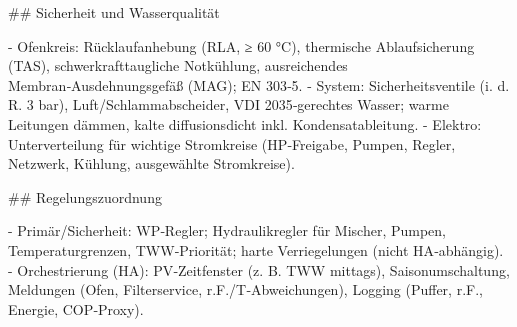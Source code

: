 \documentclass[11pt,oneside]{report}
\begin{document}
\begin{markdown}
## Sicherheit und Wasserqualität

- Ofenkreis: Rücklaufanhebung (RLA, ≥ 60 °C), thermische Ablaufsicherung (TAS), schwerkrafttaugliche Notkühlung, ausreichendes Membran‑Ausdehnungsgefäß (MAG); EN 303‑5.
- System: Sicherheitsventile (i. d. R. 3 bar), Luft/Schlammabscheider, VDI 2035‑gerechtes Wasser; warme Leitungen dämmen, kalte diffusionsdicht inkl. Kondensatableitung.
- Elektro: Unterverteilung für wichtige Stromkreise (HP‑Freigabe, Pumpen, Regler, Netzwerk, Kühlung, ausgewählte Stromkreise).

## Regelungszuordnung

- Primär/Sicherheit: WP‑Regler; Hydraulikregler für Mischer, Pumpen, Temperaturgrenzen, TWW‑Priorität; harte Verriegelungen (nicht HA‑abhängig).
- Orchestrierung (HA): PV‑Zeitfenster (z. B. TWW mittags), Saisonumschaltung, Meldungen (Ofen, Filterservice, r.F./T‑Abweichungen), Logging (Puffer, r.F., Energie, COP‑Proxy).
\end{markdown}
\end{document}

